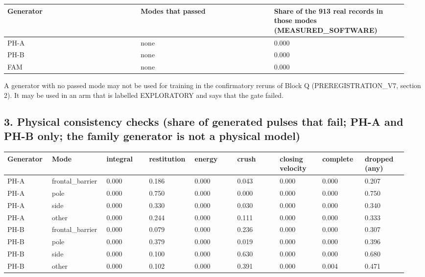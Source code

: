 {\scriptsize\raggedright
\begin{longtable}{p{0.317\linewidth}p{0.317\linewidth}p{0.317\linewidth}}
\toprule
Generator & Modes that passed & Share of the 913 real records in those modes (MEASURED\_SOFTWARE) \\
\midrule
\endhead
PH-A & none & 0.000 \\
PH-B & none & 0.000 \\
FAM & none & 0.000 \\
\bottomrule
\end{longtable}}

A generator with no passed mode may not be used for training in the confirmatory reruns of Block Q (PREREGISTRATION\_V7, section 2). It may be used in an arm that is labelled EXPLORATORY and says that the gate failed.

\subsection*{3. Physical consistency checks (share of generated pulses that fail; PH-A and PH-B only; the family generator is not a physical model)}

{\scriptsize\raggedright
\begin{longtable}{p{0.106\linewidth}p{0.106\linewidth}p{0.106\linewidth}p{0.106\linewidth}p{0.106\linewidth}p{0.106\linewidth}p{0.106\linewidth}p{0.106\linewidth}p{0.106\linewidth}}
\toprule
Generator & Mode & integral & restitution & energy & crush & closing velocity & complete & dropped (any) \\
\midrule
\endhead
PH-A & frontal\_barrier & 0.000 & 0.186 & 0.000 & 0.043 & 0.000 & 0.000 & 0.207 \\
PH-A & pole & 0.000 & 0.750 & 0.000 & 0.000 & 0.000 & 0.000 & 0.750 \\
PH-A & side & 0.000 & 0.330 & 0.000 & 0.030 & 0.000 & 0.000 & 0.340 \\
PH-A & other & 0.000 & 0.244 & 0.000 & 0.111 & 0.000 & 0.000 & 0.333 \\
PH-B & frontal\_barrier & 0.000 & 0.079 & 0.000 & 0.236 & 0.000 & 0.000 & 0.307 \\
PH-B & pole & 0.000 & 0.379 & 0.000 & 0.019 & 0.000 & 0.000 & 0.396 \\
PH-B & side & 0.000 & 0.100 & 0.000 & 0.630 & 0.000 & 0.000 & 0.680 \\
PH-B & other & 0.000 & 0.102 & 0.000 & 0.391 & 0.000 & 0.004 & 0.471 \\
\bottomrule
\end{longtable}}

